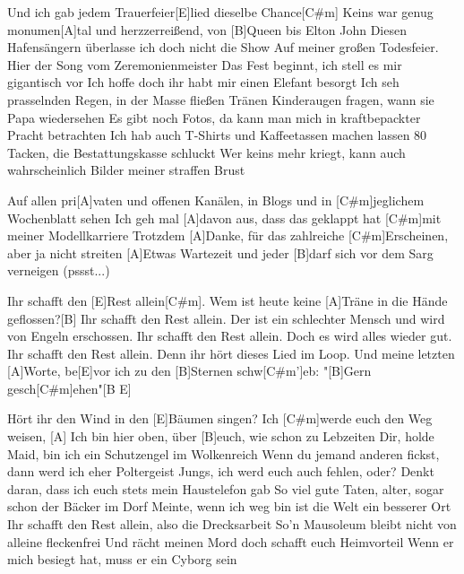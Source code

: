 

\vspace{-1em}



\vspace{-0.5em}

\begin{guitar}
	Und ich gab jedem Trauerfeier[E]lied dieselbe Chance[C#m]{}
	Keins war genug monumen[A]tal und herzzerreißend, von [B]Queen bis Elton John
	Diesen Hafensängern überlasse ich doch nicht die Show
	Auf meiner großen Todesfeier. Hier der Song vom Zeremonienmeister
	Das Fest beginnt, ich stell es mir gigantisch vor
	Ich hoffe doch ihr habt mir einen Elefant besorgt
	Ich seh prasselnden Regen, in der Masse fließen Tränen
	Kinderaugen fragen, wann sie Papa wiedersehen
	Es gibt noch Fotos, da kann man mich in kraftbepackter Pracht betrachten
	Ich hab auch T-Shirts und Kaffeetassen machen lassen
	80 Tacken, die Bestattungskasse schluckt
	Wer keins mehr kriegt, kann auch wahrscheinlich Bilder meiner straffen Brust
	
	Auf allen pri[A]vaten und offenen Kanälen, in Blogs und in [C#m]jeglichem Wochenblatt sehen
	Ich geh mal [A]davon aus, dass das geklappt hat [C#m]mit meiner Modellkarriere
	Trotzdem [A]Danke, für das zahlreiche [C#m]Erscheinen, aber ja nicht streiten
	[A]Etwas Wartezeit und jeder [B]darf sich vor dem Sarg verneigen (pssst...)
	
	Ihr schafft den [E]Rest allein[C#m].
	Wem ist heute keine [A]Träne in die Hände geflossen?[B]{}
	Ihr schafft den Rest allein.
	Der ist ein schlechter Mensch und wird von Engeln erschossen.
	Ihr schafft den Rest allein.
	Doch es wird alles wieder gut.
	Ihr schafft den Rest allein.
	Denn ihr hört dieses Lied im Loop.
	Und meine letzten [A]Worte, be[E]vor ich zu den [B]Sternen schw[C#m']eb:
	"[B]Gern gesch[C#m]ehen"[B E]{}
	
	Hört ihr den Wind in den [E]Bäumen singen? Ich [C#m]werde euch den Weg weisen, 
	[A] Ich bin hier oben, über [B]euch, wie schon zu Lebzeiten
	Dir, holde Maid, bin ich ein Schutzengel im Wolkenreich
	Wenn du jemand anderen fickst, dann werd ich eher Poltergeist
	Jungs, ich werd euch auch fehlen, oder?
	Denkt daran, dass ich euch stets mein Haustelefon gab
	So viel gute Taten, alter, sogar schon der Bäcker im Dorf
	Meinte, wenn ich weg bin ist die Welt ein besserer Ort
	Ihr schafft den Rest allein, also die Drecksarbeit
	So'n Mausoleum bleibt nicht von alleine fleckenfrei
	Und rächt meinen Mord doch schafft euch Heimvorteil
	Wenn er mich besiegt hat, muss er ein Cyborg sein
	

\end{guitar}
